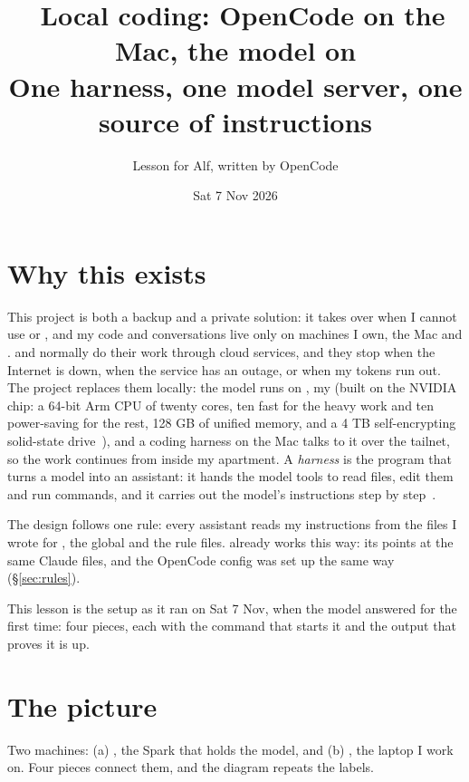 \documentclass[11pt,a4paper]{article}
\title{\emo{laptop}\ Local coding: OpenCode on the Mac, the model on \name{AlfSPARK}\\[0.3em]
  \large One harness, one model server, one source of instructions}
\author{Lesson for Alf, written by OpenCode}
\date{Sat 7 Nov 2026}
\begin{document}
\maketitle

\section*{Why this exists}

This project is both a backup and a private solution: it takes over when I cannot use  or , and my code and conversations live only on machines I own, the Mac and .  and  normally do their work through cloud services, and they stop when the Internet is down, when the service has an outage, or when my tokens run out. The  project replaces them locally: the model runs on , my  (built on the NVIDIA  chip: a 64-bit Arm CPU of twenty cores, ten fast  for the heavy work and ten power-saving  for the rest, 128 GB of unified memory, and a 4 TB self-encrypting solid-state drive~\cite{dgx}), and a coding harness on the Mac talks to it over the tailnet, so the work continues from inside my apartment. A \emph{harness} is the program that turns a model into an assistant: it hands the model tools to read files, edit them and run commands, and it carries out the model's instructions step by step~\cite{wwc}.

The design follows one rule: every assistant reads my instructions from the files I wrote for , the global  and the rule files.  already works this way: its  points at the same Claude files, and the OpenCode config was set up the same way (\S\ref{sec:rules}).

This lesson is the setup as it ran on Sat 7 Nov, when the model answered for the first time: four pieces, each with the command that starts it and the output that proves it is up.

\section{The picture}

Two machines: (a) , the Spark that holds the model, and (b) , the laptop I work on. Four pieces connect them, and the diagram repeats the labels.
\end{document}
